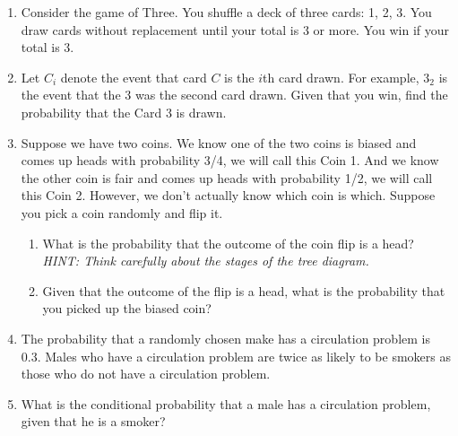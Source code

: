 \documentclass{article}
\begin{document}
\begin{enumerate}
    \item Consider the game of Three. You shuffle a deck of three cards: 1, 2, 3. You draw cards without replacement until your total is 3 or more. You win if your total is 3.
    \item[] Let $C_i$ denote the event that card $C$ is the $i$th card drawn.
For example, $3_2$ is the event that the 3 was the second card drawn. Given that you win, find the probability that the Card 3 is drawn.\vspace{100pt}%
    
    \item Suppose we have two coins. We know one of the two coins is biased and comes up heads with probability 3/4, we will call this Coin 1. And we know the other coin is fair and comes up heads with probability 1/2, we will call this Coin 2. However, we don't actually know which coin is which. Suppose you pick a coin randomly and flip it.%
    \begin{enumerate}
        \item What is the probability that the outcome of the coin flip is a head? \\\textit{HINT: Think carefully about the stages of the tree diagram.}\vspace{100pt}
        \item Given that the outcome of the flip is a head, what is the probability that you picked up the biased coin?\vspace{40pt}
    \end{enumerate}\bigskip
    
    \item The probability that a randomly chosen make has a circulation problem is 0.3. Males who have a circulation problem are twice as likely to be smokers as those who do not have a circulation problem.%
    \item[] What is the conditional probability that a male has a circulation problem, given that he is a smoker?\vspace{100pt}
    
\end{enumerate}
\end{document}
